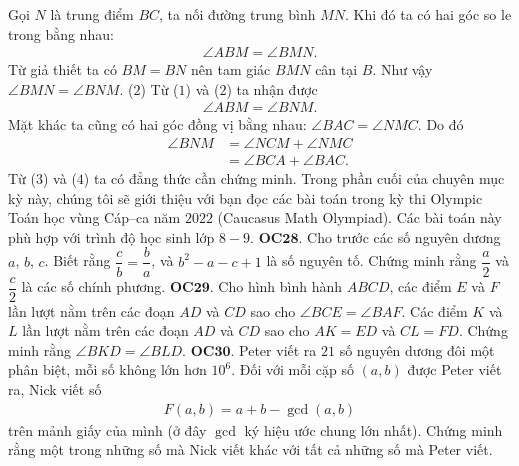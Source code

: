 \begin{multicols}{2}
	Gọi $N$ là trung điểm $BC$, ta nối đường trung bình $MN$. Khi đó ta có hai góc so le trong bằng nhau:
	\begin{align*}
		\angle ABM = \angle BMN. \tag{$1$}
	\end{align*}	
	Từ giả thiết ta có $BM= BN$ nên tam giác $BMN$ cân tại $B$.
	\vskip 0.1cm
	Như vậy $\angle BMN =\angle BNM$. \hfill ($2$)
	\vskip 0.1cm
	Từ ($1$) và ($2$) ta nhận được
	\begin{align*}
		\angle ABM= \angle BNM. \tag{$3$}
	\end{align*}
	Mặt khác ta cũng có hai góc đồng vị bằng nhau: $\angle BAC=\angle NMC$. Do đó 
	\begin{align*}
		\angle BNM&= \angle NCM + \angle NMC\\
		&= \angle BCA + \angle BAC. \tag{$4$}
	\end{align*}
	Từ ($3$) và ($4$) ta có đẳng thức cần chứng minh.
	\vskip 0.1cm
	Trong phần cuối của chuyên mục kỳ này, chúng tôi sẽ giới thiệu với bạn đọc các bài toán trong kỳ thi Olympic Toán học vùng Cáp--ca năm $2022$ (Caucasus Math Olympiad). Các bài toán này phù hợp với trình độ học sinh lớp $8-9$.
	\vskip 0.1cm
	{\bf\color{cackithi} OC$\pmb{28.}$} Cho trước các số nguyên dương $a$, $b$, $c$. Biết rằng $\dfrac{c}{b} = \dfrac{b}{a}$, và $b^2 - a - c + 1$ là số nguyên tố. Chứng minh rằng $\dfrac{a}{2}$ và $\dfrac{c}{2}$ là các số chính phương.
	\vskip 0.1cm
	{\bf\color{cackithi} OC$\pmb{29.}$} Cho hình bình hành $ABCD$, các điểm $E$ và $F$ lần lượt nằm trên các đoạn $AD$ và $CD$ sao cho $\angle BCE = \angle BAF.$ Các điểm $K$ và $L$ lần lượt nằm trên các đoạn $AD$ và $CD$ sao cho $AK = ED$ và $CL = FD$. Chứng minh rằng $\angle BKD = \angle BLD$.
	\vskip 0.1cm
	{\bf\color{cackithi} OC$\pmb{30.}$} Peter viết ra $21$ số nguyên dương đôi một phân biệt, mỗi số không lớn hơn $10^6$. Đối với mỗi cặp số $(a, b)$ được Peter viết ra, Nick  viết  số
	\begin{align*}
		F(a, b) = a + b - \gcd (a, b)
	\end{align*}
	trên mảnh giấy của mình (ở đây $\gcd$ ký hiệu ước chung lớn nhất). 
	\vskip 0.1cm
	Chứng minh rằng một trong những số mà Nick viết khác với tất cả những số mà Peter viết. 
\end{multicols}